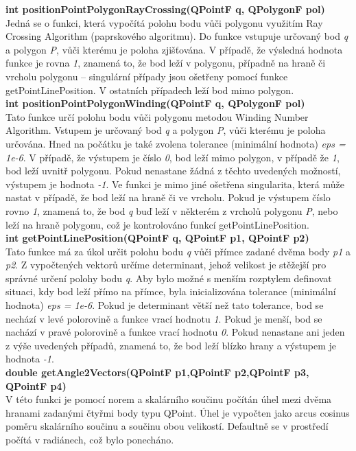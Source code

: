 \documentclass[a4paper,11pt,twoside]{article}
\begin{document}
\noindent\textbf{int positionPointPolygonRayCrossing(QPointF q, QPolygonF pol)}\\
Jedná se o funkci, která vypočítá polohu bodu vůči polygonu využitím Ray Crossing Algorithm (paprskového algoritmu). Do funkce vstupuje určovaný bod \textit{q} a polygon \textit{P}, vůči kterému je poloha zjišťována. V případě, že výsledná hodnota funkce je rovna \textit{1}, znamená to, že bod leží v polygonu, případně na hraně či vrcholu polygonu -- singulární případy jsou ošetřeny pomocí funkce getPointLinePosition. V ostatních případech leží bod mimo polygon.\\

\noindent\textbf{int positionPointPolygonWinding(QPointF q, QPolygonF pol)}\\
Tato funkce určí polohu bodu vůči polygonu metodou Winding Number Algorithm. Vstupem je určovaný bod \textit{q} a polygon \textit{P}, vůči kterému je poloha určována. Hned na počátku je také zvolena tolerance (minimální hodnota) \textit{eps = 1e-6}. V případě, že výstupem je číslo \textit{0}, bod leží mimo polygon, v případě že \textit{1}, bod leží uvnitř polygonu. Pokud nenastane žádná z těchto uvedených možností, výstupem je hodnota \textit{-1}. Ve funkci je mimo jiné ošetřena singularita, která může nastat v případě, že bod leží na hraně či ve vrcholu. Pokud je výstupem číslo rovno \textit{1}, znamená to, že bod \textit{q} buď leží v některém z vrcholů polygonu \textit{P}, nebo leží na hraně polygonu, což je kontrolováno funkcí getPointLinePosition. \\

\noindent\textbf{int getPointLinePosition(QPointF q, QPointF p1, QPointF p2)}\\
Tato funkce má za úkol určit polohu bodu \textit{q} vůči přímce zadané dvěma body \textit{p1} a \textit{p2}. Z vypočtených vektorů určíme determinant, jehož velikost je stěžejší pro správné určení polohy bodu \textit{q}.  Aby bylo možné s menším rozptylem definovat situaci, kdy bod leží přímo na přímce, byla inicializována tolerance (minimální hodnota) \textit{eps = 1e-6}. Pokud je determinant větší než tato tolerance, bod se nechází v levé polorovině a funkce vrací hodnotu \textit{1}. Pokud je menší, bod se nachází v pravé polorovině a funkce vrací hodnotu \textit{0}.  Pokud nenastane ani jeden z výše uvedených případů, znamená to, že bod leží blízko hrany a výstupem je hodnota \textit{-1}.\\

\noindent\textbf{double getAngle2Vectors(QPointF p1,QPointF p2,QPointF p3, \\ QPointF p4)}\\
V této funkci je pomocí norem a skalárního součinu počítán úhel mezi dvěma hranami zadanými čtyřmi body typu QPoint. Úhel je vypočten jako arcus cosinus poměru skalárního součinu a součinu obou velikostí. Defaultně se v prostředí počítá v radiánech, což bylo ponecháno.
\end{document}
